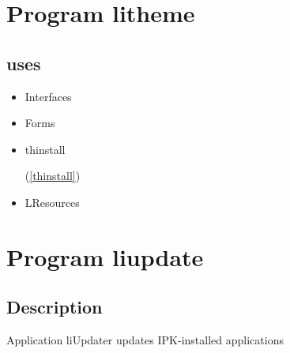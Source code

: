\documentclass{report}
\begin{document}
\chapter{Program litheme}
\label{litheme}
\section{uses}
\begin{itemize}
\item \begin{ttfamily}Interfaces\end{ttfamily}\item \begin{ttfamily}Forms\end{ttfamily}\item \begin{ttfamily}thinstall\end{ttfamily}(\ref{thinstall})\item \begin{ttfamily}LResources\end{ttfamily}\end{itemize}
\chapter{Program liupdate}
\label{liupdate}
\section{Description}
Application liUpdater updates IPK{-}installed applications
\end{document}
